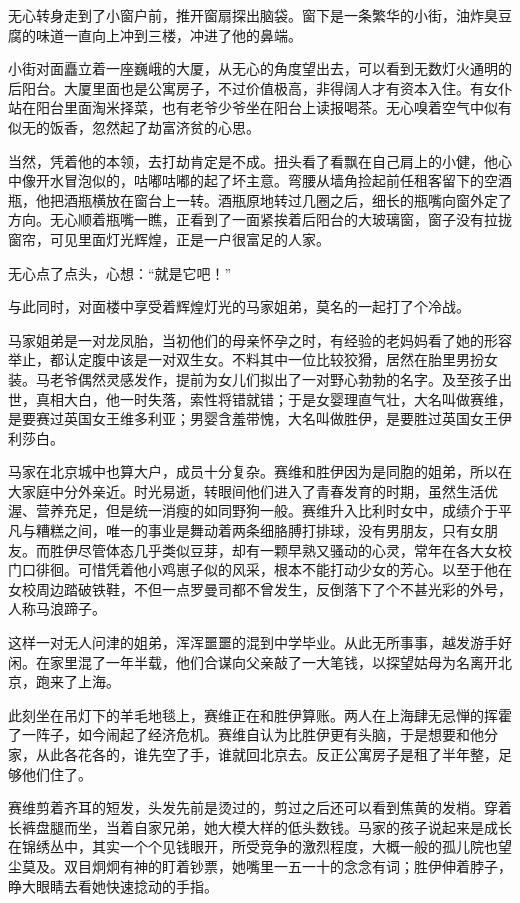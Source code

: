 无心转身走到了小窗户前，推开窗扇探出脑袋。窗下是一条繁华的小街，油炸臭豆腐的味道一直向上冲到三楼，冲进了他的鼻端。

小街对面矗立着一座巍峨的大厦，从无心的角度望出去，可以看到无数灯火通明的后阳台。大厦里面也是公寓房子，不过价值极高，非得阔人才有资本入住。有女仆站在阳台里面淘米择菜，也有老爷少爷坐在阳台上读报喝茶。无心嗅着空气中似有似无的饭香，忽然起了劫富济贫的心思。

当然，凭着他的本领，去打劫肯定是不成。扭头看了看飘在自己肩上的小健，他心中像开水冒泡似的，咕嘟咕嘟的起了坏主意。弯腰从墙角捡起前任租客留下的空酒瓶，他把酒瓶横放在窗台上一转。酒瓶原地转过几圈之后，细长的瓶嘴向窗外定了方向。无心顺着瓶嘴一瞧，正看到了一面紧挨着后阳台的大玻璃窗，窗子没有拉拢窗帘，可见里面灯光辉煌，正是一户很富足的人家。

无心点了点头，心想：``就是它吧！''

与此同时，对面楼中享受着辉煌灯光的马家姐弟，莫名的一起打了个冷战。

马家姐弟是一对龙凤胎，当初他们的母亲怀孕之时，有经验的老妈妈看了她的形容举止，都认定腹中该是一对双生女。不料其中一位比较狡猾，居然在胎里男扮女装。马老爷偶然灵感发作，提前为女儿们拟出了一对野心勃勃的名字。及至孩子出世，真相大白，他一时失落，索性将错就错；于是女婴理直气壮，大名叫做赛维，是要赛过英国女王维多利亚；男婴含羞带愧，大名叫做胜伊，是要胜过英国女王伊利莎白。

马家在北京城中也算大户，成员十分复杂。赛维和胜伊因为是同胞的姐弟，所以在大家庭中分外亲近。时光易逝，转眼间他们进入了青春发育的时期，虽然生活优渥、营养充足，但是统一消瘦的如同野狗一般。赛维升入比利时女中，成绩介于平凡与糟糕之间，唯一的事业是舞动着两条细胳膊打排球，没有男朋友，只有女朋友。而胜伊尽管体态几乎类似豆芽，却有一颗早熟又骚动的心灵，常年在各大女校门口徘徊。可惜凭着他小鸡崽子似的风采，根本不能打动少女的芳心。以至于他在女校周边踏破铁鞋，不但一点罗曼司都不曾发生，反倒落下了个不甚光彩的外号，人称马浪蹄子。

这样一对无人问津的姐弟，浑浑噩噩的混到中学毕业。从此无所事事，越发游手好闲。在家里混了一年半载，他们合谋向父亲敲了一大笔钱，以探望姑母为名离开北京，跑来了上海。

此刻坐在吊灯下的羊毛地毯上，赛维正在和胜伊算账。两人在上海肆无忌惮的挥霍了一阵子，如今闹起了经济危机。赛维自认为比胜伊更有头脑，于是想要和他分家，从此各花各的，谁先空了手，谁就回北京去。反正公寓房子是租了半年整，足够他们住了。

赛维剪着齐耳的短发，头发先前是烫过的，剪过之后还可以看到焦黄的发梢。穿着长裤盘腿而坐，当着自家兄弟，她大模大样的低头数钱。马家的孩子说起来是成长在锦绣丛中，其实一个个见钱眼开，所受竞争的激烈程度，大概一般的孤儿院也望尘莫及。双目炯炯有神的盯着钞票，她嘴里一五一十的念念有词；胜伊伸着脖子，睁大眼睛去看她快速捻动的手指。

